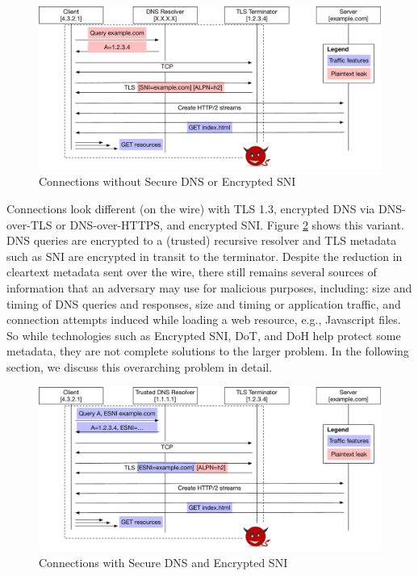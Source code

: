 \documentclass[runningheads]{llncs}
\begin{document}
\begin{figure}
\includegraphics[scale=0.35]{figures/connection_flow}
\caption{Connections without Secure DNS or Encrypted SNI}
\label{fig:connections-then}
\end{figure}

Connections look different (on the wire) with TLS 1.3, encrypted DNS via DNS-over-TLS or
DNS-over-HTTPS, and encrypted SNI. Figure \ref{fig:connections-now} shows this variant.
DNS queries are encrypted to a (trusted) recursive resolver and TLS metadata such as SNI
are encrypted in transit to the terminator. Despite the reduction in cleartext metadata
sent over the wire, there still remains several sources of information that an adversary
may use for malicious purposes, including: size and timing of DNS queries and responses,
size and timing or application traffic, and connection attempts induced while loading a
web resource, e.g., Javascript files. So while technologies such as Encrypted SNI, DoT,
and DoH help protect some metadata, they are not complete solutions to the larger problem.
In the following section, we discuss this overarching problem in detail.

\begin{figure}
\includegraphics[scale=0.35]{figures/connection_flow_now}
\caption{Connections with Secure DNS and Encrypted SNI}
\label{fig:connections-now}
\end{figure}
\end{document}
